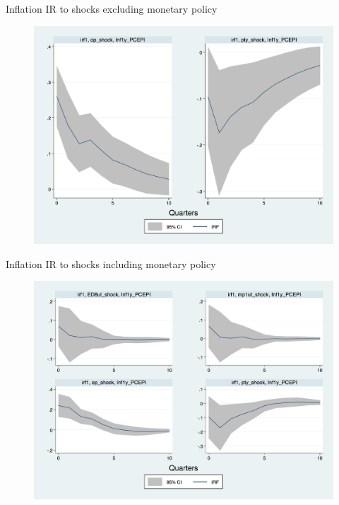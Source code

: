 \documentclass{beamer}
\begin{document}
\begin{frame}{Inflation IR to  shocks excluding monetary policy}

\begin{figure}
	\includegraphics[scale=0.3]{figures/PCEPI_ashocks_nmp.png} 
\end{figure}

\end{frame}



\begin{frame}{Inflation IR to  shocks including monetary policy}

\begin{figure}
	\includegraphics[scale=0.3]{figures/PCEPI_ashocks.png} 
\end{figure}

\end{frame}
\end{document}
